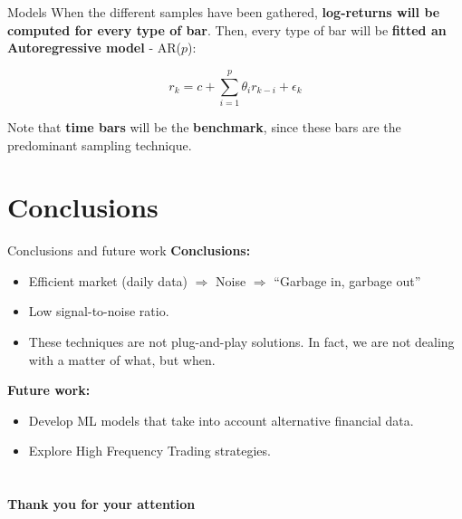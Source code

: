 \documentclass[usenames,dvipsnames]{beamer} %
\begin{document}
\begin{frame}{Models}
\vfill
When the different samples have been gathered, \textbf{log-returns will be 
computed for every type of bar}. Then, every type of bar will be 
\textbf{fitted an Autoregressive model} - AR($p$):

\vfill
\begin{equation*}
	r_k = c + \sum_{i=1}^p \theta_i r_{k-i} + \epsilon_k
\end{equation*}

\vfill
Note that \textbf{time bars} will be the \textbf{benchmark}, since these bars 
are the predominant sampling technique.

\begin{table}
\centering
{}
\end{table}
\end{frame}

\section{Conclusions}
\frame{\tableofcontents[currentsection]}

\begin{frame}{Conclusions and future work}
\textbf{Conclusions:}
\begin{itemize}
	\item Efficient market (daily data) $\Rightarrow$ Noise $\Rightarrow$ 
	``Garbage in, garbage out''
	
	\vspace{.15cm}
	\item Low signal-to-noise ratio.	
	
	\vspace{.15cm}
	\item These techniques are not plug-and-play solutions. In fact, we are 
	not	dealing with a matter of what, but when.
\end{itemize}

\vspace{.5cm}
\textbf{Future work:}
\begin{itemize}
	\item Develop ML models that take into account alternative financial 
	data.
	
	\vspace{.15cm}
	\item Explore High Frequency Trading strategies.
\end{itemize}

\end{frame}

\section{}
\begin{frame}
	\Large
	\begin{center}
		\textbf{Thank you for your attention}
	\end{center}

\end{frame}
\end{document}

